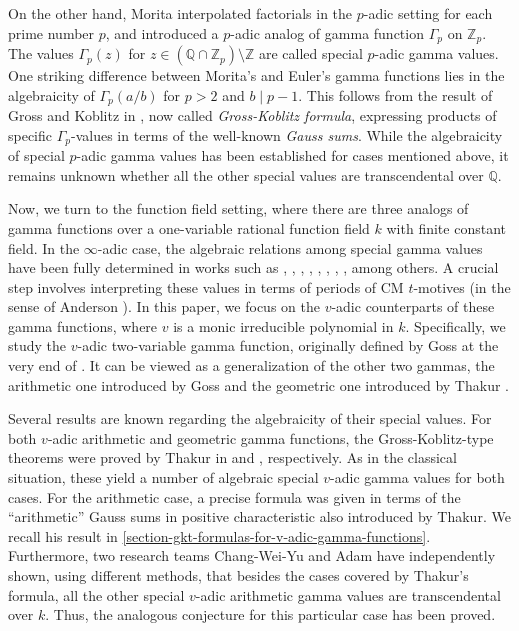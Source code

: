 \documentclass[11pt]{amsart}
\theoremstyle{plain}
\theoremstyle{definition}
\theoremstyle{remark}
\numberwithin{equation}{section}
\newcommand{\ZZ}{\mathbb{Z}}
\newcommand{\QQ}{\mathbb{Q}}
\begin{document}
	On the other hand, Morita \cite{morita1975padic} interpolated factorials in the $p$-adic setting for each prime number $p$, and introduced a $p$-adic analog of gamma function $\Gamma_p$ on $\ZZ_p$.
	The values $\Gamma_p(z)$ for $z \in (\QQ \cap \ZZ_p) \setminus \ZZ$ are called special $p$-adic gamma values.
	One striking difference between Morita's and Euler's gamma functions lies in the algebraicity of $\Gamma_p(a/b)$ for $p>2$ and $b \mid p-1$.
	This follows from the result of Gross and Koblitz in \cite{gk1979gauss}, now called \textit{Gross-Koblitz formula}, expressing products of specific $\Gamma_p$-values in terms of the well-known \textit{Gauss sums}.
	While the algebraicity of special $p$-adic gamma values has been established for cases mentioned above, it remains unknown whether all the other special values are transcendental over $\QQ$.
	
	Now, we turn to the function field setting, where there are three analogs of gamma functions over a one-variable rational function field $k$ with finite constant field.
	In the $\infty$-adic case, the algebraic relations among special gamma values have been fully determined in works such as \cite{thakur1991gamma}, \cite{thakur1996transcendence}, \cite{allouche1996transcendence}, \cite{cpty2010algebraic}, \cite{sinha1997periods}, \cite{bp2002linear}, \cite{abp2004determination}, \cite{wei2022algebraic}, among others.
	A crucial step involves interpreting these values in terms of periods of CM $t$-motives (in the sense of Anderson \cite{anderson1986tmotives}).
	In this paper, we focus on the $v$-adic counterparts of these gamma functions, where $v$ is a monic irreducible polynomial in $k$.
	Specifically, we study the $v$-adic two-variable gamma function, originally defined by Goss at the very end of \cite[Subsection 9.9]{goss1996basic}.
	It can be viewed as a generalization of the other two gammas, the arithmetic one introduced by Goss \cite[Appendix]{goss1980modular} and the geometric one introduced by Thakur \cite[Section 5]{thakur1991gamma}.
	
	Several results are known regarding the algebraicity of their special values.
	For both $v$-adic arithmetic and geometric gamma functions, the Gross-Koblitz-type theorems were proved by Thakur in \cite{thakur1988gauss} and \cite[Section 8.6]{thakur2004function}, respectively.
	As in the classical situation, these yield a number of algebraic special $v$-adic gamma values for both cases.
	For the arithmetic case, a precise formula was given in terms of the “arithmetic” Gauss sums in positive characteristic also introduced by Thakur.
	We recall his result in \ref{section-gkt-formulas-for-v-adic-gamma-functions}.
	Furthermore, two research teams Chang-Wei-Yu \cite{cwy2024vadic} and Adam \cite{adam2023transcendance} have independently shown, using different methods, that besides the cases covered by Thakur's formula, all the other special $v$-adic arithmetic gamma values are transcendental over $k$.
	Thus, the analogous conjecture for this particular case has been proved.
	
\end{document}

